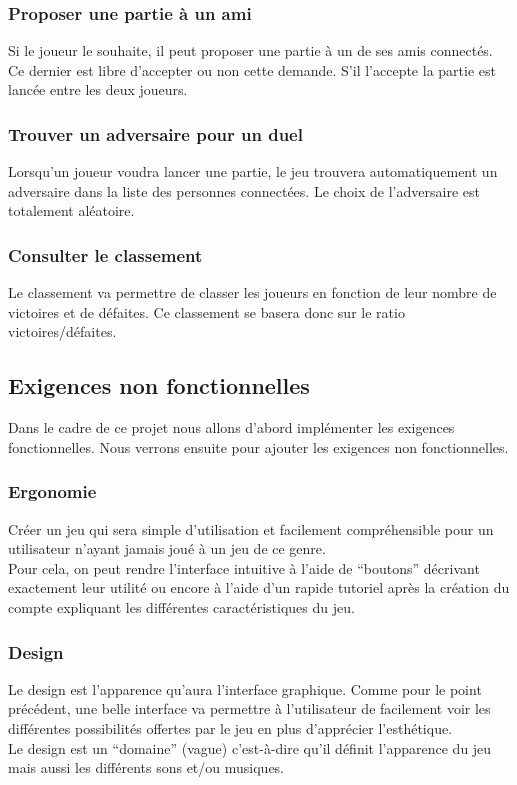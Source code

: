 \documentclass[11pt,a4paper]{article}
\begin{document}
\subsubsection*{Proposer une partie à un ami}

Si le joueur le souhaite, il peut proposer une partie à un de ses
amis connectés. Ce dernier est libre d'accepter ou non cette demande.
S'il l'accepte la partie est lancée entre les deux joueurs.


\subsubsection*{Trouver un adversaire pour un duel}

Lorsqu'un joueur voudra lancer une partie, le jeu trouvera
automatiquement un adversaire dans la liste des personnes
connectées. Le choix de l'adversaire est totalement aléatoire.


\subsubsection*{Consulter le classement}

Le classement va permettre de classer les joueurs en fonction de
leur nombre de victoires et de défaites. Ce classement se
basera donc sur le ratio victoires/défaites.


\subsection{Exigences non fonctionnelles}
\label{sec:exi-nonfonc}

Dans le cadre de ce projet nous allons d'abord implémenter les exigences fonctionnelles.  Nous verrons ensuite pour ajouter les exigences non fonctionnelles.


\subsubsection*{Ergonomie}
Créer un jeu qui sera simple d'utilisation et facilement compréhensible pour un utilisateur n'ayant jamais joué à un jeu de ce genre.\\
Pour cela, on peut rendre l'interface intuitive à l'aide de ``boutons'' décrivant exactement leur utilité ou encore à l'aide d'un rapide tutoriel après la création du compte expliquant les différentes caractéristiques du jeu.


\subsubsection*{Design}
Le design est l'apparence qu'aura l'interface graphique. Comme pour le point précédent, une belle interface va permettre à l'utilisateur de facilement voir les différentes possibilités offertes par le jeu en plus d'apprécier l'esthétique.\\
Le design est un ``domaine'' (vague) c'est-à-dire qu'il définit l'apparence du jeu mais aussi les différents sons et/ou musiques.
\end{document}
